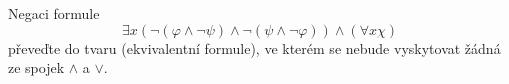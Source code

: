 Negaci formule 
$$\exists x (\neg (\varphi \wedge \neg \psi)\wedge \neg(\psi\wedge
\neg \varphi))\wedge (\forall x \chi )$$ 
převeďte do tvaru (ekvivalentní formule), ve kterém se nebude vyskytovat žádná
ze spojek $\wedge$ a $ \vee $.
